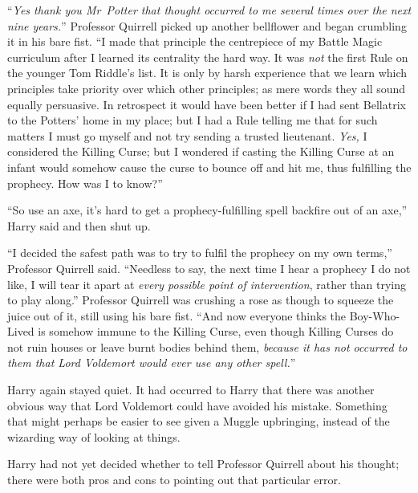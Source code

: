“\emph{Yes thank you Mr~Potter that thought occurred to me several times over
the next nine years.}” Professor Quirrell picked up another bellflower and
began crumbling it in his bare fist. “I made that principle the centrepiece of
my Battle Magic curriculum after I learned its centrality the hard way. It was
\emph{not} the first Rule on the younger Tom Riddle’s list. It is only by harsh
experience that we learn which principles take priority over which other
principles; as mere words they all sound equally persuasive. In retrospect it
would have been better if I had sent Bellatrix to the Potters’ home in my
place; but I had a Rule telling me that for such matters I must go myself and
not try sending a trusted lieutenant. \emph{Yes,} I considered the Killing
Curse; but I wondered if casting the Killing Curse at an infant would somehow
cause the curse to bounce off and hit me, thus fulfilling the prophecy. How was
I to know?”

“So use an axe, it’s hard to get a prophecy-fulfilling spell backfire out of an
axe,” Harry said and then shut up.

“I decided the safest path was to try to fulfil the prophecy on my own terms,”
Professor Quirrell said. “Needless to say, the next time I hear a prophecy I do
not like, I will tear it apart at \emph{every possible point of intervention},
rather than trying to play along.” Professor Quirrell was crushing a rose as
though to squeeze the juice out of it, still using his bare fist. “And now
everyone thinks the Boy-Who-Lived is somehow immune to the Killing Curse, even
though Killing Curses do not ruin houses or leave burnt bodies behind them,
\emph{because it has not occurred to them that Lord Voldemort would ever use
any other spell.}”

Harry again stayed quiet. It had occurred to Harry that there was another
obvious way that Lord Voldemort could have avoided his mistake. Something that
might perhaps be easier to see given a Muggle upbringing, instead of the
wizarding way of looking at things.

Harry had not yet decided whether to tell Professor Quirrell about his thought;
there were both pros and cons to pointing out that particular error.

